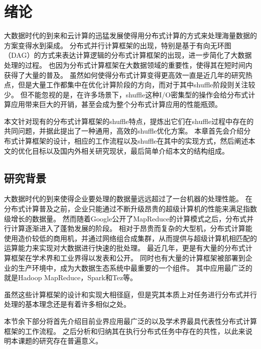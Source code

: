 
\chapter{绪论}
\label{chap:intro}

大数据时代的到来和云计算的迅猛发展使得用分布式计算的方式来处理海量数据的方案变得水到渠成。
分布式并行计算框架的出现，特别是基于有向无环图（DAG）的方式来表达计算逻辑的分布式计算框架的出现，进一步简化了大数据处理的过程。
也因为分布式计算框架在大数据领域的重要性，使得其在短时间内获得了大量的普及。
虽然如何使得分布式计算变得更高效一直是近几年的研究热点，但是大量工作都集中在优化计算阶段的方向，而对于其中shuffle阶段则关注较少。
但不能忽视的是，在许多场景下，shuffle这种I/O密集型的操作会给分布式计算应用带来巨大的开销，甚至会成为整个分布式计算应用的性能瓶颈。

本文针对现有的分布式计算框架的shuffle特点，提炼出它们在shuffle过程中存在的共同问题，并据此提出了一种通用，高效的shuffle优化方案。
本章首先会介绍分布式计算框架的设计，相应的工作流程以及shuffle在其中的实现方式，然后阐述本文的优化目标以及国内外相关研究现状，最后简单介绍本文的结构组成。

\section{研究背景}

大数据时代的到来使得企业要处理的数据量远远超过了一台机器的处理性能。
在分布式计算普及之前，企业只能通过不断升级昂贵的超级计算机的性能来满足指数级增长的数据量。
然而随着Google公开了MapReduce\cite{mapreduce}的计算模式之后，分布式并行计算逐渐进入了蓬勃发展的阶段。
相对于昂贵而复杂的大型机，分布式计算能使用造价较低的商用机，并通过网络组合成集群，从而提供与超级计算机相匹配的运算能力来实现对大数据进行快速的批处理。
最近几年，更是有大量的分布式计算框架在学术界和工业界得以发表和公开。
同时也有大量的计算框架被部署到企业的生产环境中，成为大数据生态系统中最重要的一个组件。
其中应用最广泛的就是Hadoop MapReduce\cite{hadoop}，Spark\cite{apachespark}和Tez\cite{tez}等。

虽然这些计算框架的设计和实现大相径庭，但是究其本质上对任务进行分布式并行处理的基本理念还是有着许多相似之处。

本节余下部分将首先介绍目前业界应用最广泛的以及学术界最具代表性分布式计算框架的工作流程。
之后分析和归纳其在执行分布式任务中存在的共性，以此来说明本课题的研究存在普遍意义。

